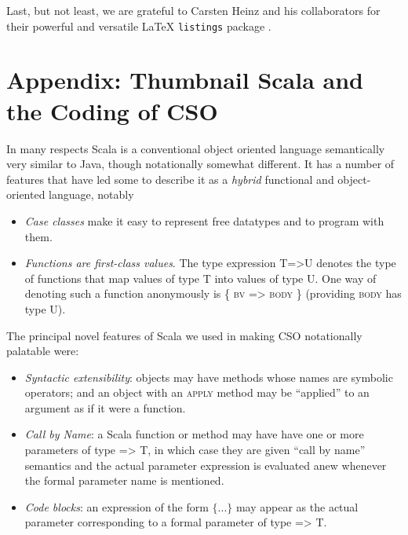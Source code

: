 \documentclass[12pt]{IOS-Book-Article-CPA-2017}
\begin{document}
Last, but not least, we are grateful to Carsten Heinz and his
collaborators for their powerful and versatile LaTeX \texttt{listings} package
\cite{listings}.

\newpage\section*{Appendix: Thumbnail Scala and the Coding of CSO}
In many respects Scala is a conventional object oriented language
semantically very similar to Java, though notationally somewhat
different.
%
It has a number of features that have led some to describe it as a
\textit{hybrid} functional and object-oriented language, notably
\begin{itemize}
\item \textit{Case classes} make it
      easy to represent free datatypes and to program with them.

\item \textit{Functions are first-class values}. The type expression \textsc{T=>U} 
      denotes the type of functions that map values of type \textsc{T}
      into values of type \textsc{U}. One way of denoting
      such a function anonymously is \textsc{\{ bv => body \}}
      (providing \textsc{body} has type \textsc{U}).
\end{itemize}
The principal novel features of Scala we used in making
CSO  notationally palatable were:
\begin{itemize}
\item   \textit{Syntactic extensibility}: objects may have methods
        whose names are symbolic operators; and an object
        with an \textsc{apply} method may be ``applied'' to
        an argument as if it were a function.

\item   \textit{Call by Name}: a Scala function or method may have 
        have one or more parameters of type \textsc{=> T}, in which
        case they are given ``call by name'' semantics and the
        actual parameter expression is evaluated anew whenever the
        formal parameter name is mentioned.

\item   \textit{Code blocks}: an expression of the form $\{...\}$
        may appear as the actual parameter corresponding to a formal
        parameter of type \textsc{=> T}. 
\end{itemize}
\end{document}
